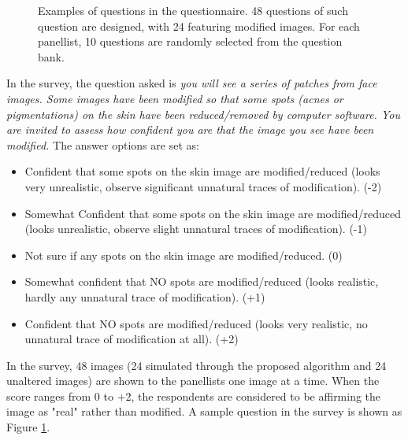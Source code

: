 \begin{spacing}{1.5}
\begin{figure}[t!]
    \caption{Examples of questions in the questionnaire. 48 questions of such question are designed, with 24 featuring modified images. For each panellist, 10 questions are randomly selected from the question bank.}
    \label{fig:sample_form}
\end{figure}
In the survey, the question asked is \textit{you will see a series of patches from face images. Some images have been modified so that some spots (acnes or pigmentations) on the skin have been reduced/removed by computer software. You are invited to assess how confident you are that the image you see have been modified.} The answer options are set as:
\begin{itemize}
    \item Confident that some spots on the skin image are modified/reduced (looks very unrealistic, observe significant unnatural traces of modification). (-2)
    \item Somewhat Confident that some spots on the skin image are modified/reduced (looks unrealistic, observe slight unnatural traces of modification). (-1)
    \item Not sure if any spots on the skin image are modified/reduced. (0)
    \item Somewhat confident that NO spots are modified/reduced (looks realistic, hardly any unnatural trace of modification). (+1)
    \item Confident that NO spots are modified/reduced (looks very realistic, no unnatural trace of modification at all). (+2)
\end{itemize}

In the survey, 48 images (24 simulated through the proposed algorithm and 24 unaltered images) are shown to the panellists one image at a time. When the score ranges from 0 to +2, the respondents are considered to be affirming the image as "real" rather than modified. A sample question in the survey is shown as Figure \ref{fig:sample_form}.
\end{spacing}
\newpage
